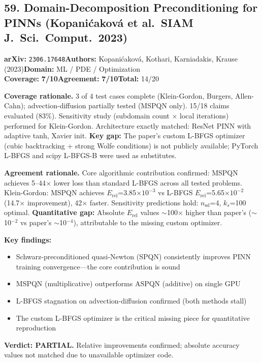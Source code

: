 \documentclass[11pt]{article}
\newcommand{\scorebadge}[2]{\textbf{#1:} \textbf{#2/10}}
\begin{document}
\subsection{59. Domain-Decomposition Preconditioning for PINNs (Kopani\'cakov\'a et al.\ SIAM J.~Sci.~Comput.\ 2023)}
\textbf{arXiv:} \texttt{2306.17648}\quad\textbf{Authors:} Kopani\'cakov\'a, Kothari, Karniadakis, Krause (2023)\quad\textbf{Domain:} ML / PDE / Optimization\\
\scorebadge{Coverage}{7}\quad\scorebadge{Agreement}{7}\quad\textbf{Total:} 14/20\par\smallskip
\noindent\textbf{Coverage rationale.} 3 of 4 test cases complete (Klein-Gordon, Burgers, Allen-Cahn); advection-diffusion partially tested (MSPQN only). 15/18 claims evaluated (83\%). Sensitivity study (subdomain count $\times$ local iterations) performed for Klein-Gordon. Architecture exactly matched: ResNet PINN with adaptive tanh, Xavier init. \textbf{Key gap:} The paper's custom L-BFGS optimizer (cubic backtracking + strong Wolfe conditions) is not publicly available; PyTorch L-BFGS and scipy L-BFGS-B were used as substitutes.\par
\noindent\textbf{Agreement rationale.} Core algorithmic contribution confirmed: MSPQN achieves 5--44$\times$ lower loss than standard L-BFGS across all tested problems. Klein-Gordon: MSPQN achieves $E_{\mathrm{rel}}$=3.85$\times 10^{-3}$ vs L-BFGS $E_{\mathrm{rel}}$=5.65$\times 10^{-2}$ (14.7$\times$ improvement), 42$\times$ faster. Sensitivity predictions hold: $n_{\mathrm{sd}}$=4, $k_s$=100 optimal. \textbf{Quantitative gap:} Absolute $E_{\mathrm{rel}}$ values $\sim$100$\times$ higher than paper's ($\sim$10$^{-2}$ vs paper's $\sim$10$^{-4}$), attributable to the missing custom optimizer.\par\smallskip
\noindent\textbf{Key findings:}
\begin{itemize}[leftmargin=1.4em,itemsep=0.2em,topsep=0.2em]
\item Schwarz-preconditioned quasi-Newton (SPQN) consistently improves PINN training convergence---the core contribution is sound
\item MSPQN (multiplicative) outperforms ASPQN (additive) on single GPU
\item L-BFGS stagnation on advection-diffusion confirmed (both methods stall)
\item The custom L-BFGS optimizer is the critical missing piece for quantitative reproduction
\end{itemize}
\noindent\textbf{Verdict: PARTIAL.} Relative improvements confirmed; absolute accuracy values not matched due to unavailable optimizer code.
\end{document}
